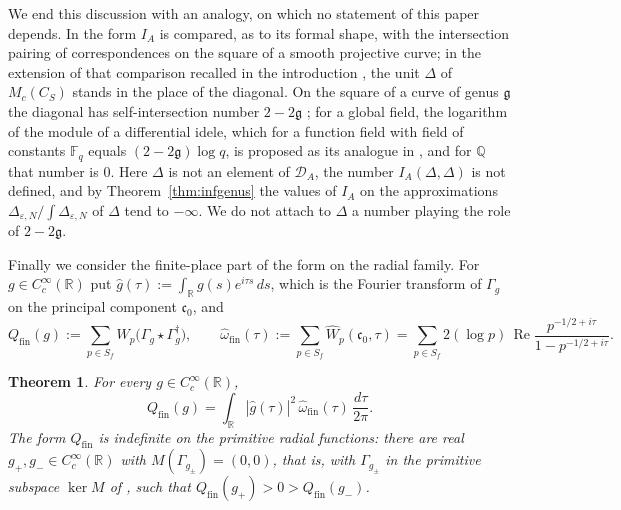 \documentclass[11pt]{amsart}
\newtheorem{theorem}{Theorem}[section]
\theoremstyle{definition}
\newcommand{\R}{\mathbb R}
\newcommand{\Q}{\mathbb Q}
\newcommand{\Rel}{\operatorname{Re}}
\newcommand{\DA}{\mathcal D_A}
\begin{document}
We end this discussion with an analogy, on which no statement of this paper
depends. In \cite[Section~1]{Companion} the form $I_A$ is compared, as to
its formal shape, with the intersection pairing of correspondences on the
square of a smooth projective curve; in the extension of that comparison
recalled in the introduction \cite[Section~7.1]{CCM}, the unit $\Delta$
of $M_c(C_S)$ stands in the place of the diagonal. On the square of a curve
of genus $\mathfrak g$ the diagonal has self-intersection number
$2-2\mathfrak g$ \cite[Ch.~V, Exercise~1.6(a)]{Hartshorne}; for a global
field, the logarithm of the module of a differential idele, which for a
function field with field of constants $\mathbb F_q$ equals
$(2-2\mathfrak g)\log q$, is proposed as its analogue in
\cite[Section~7.1]{CCM}, and for $\Q$ that number is $0$. Here $\Delta$ is
not an element of $\DA$, the number $I_A(\Delta,\Delta)$ is not defined, and
by Theorem~\ref{thm:infgenus} the values of $I_A$ on the approximations
$\Delta_{\varepsilon,N}/\int\Delta_{\varepsilon,N}$ of $\Delta$ tend to
$-\infty$. We do not attach to $\Delta$ a number playing the role of
$2-2\mathfrak g$.

Finally we consider the finite-place part of the form on the radial family.
For $g\in C_c^\infty(\R)$ put $\widehat g(\tau):=\int_\R g(s)e^{i\tau s}\,ds$,
which is the Fourier transform of $\Gamma_g$ on the principal component
$\mathfrak c_0$, and
\begin{equation}\label{eq:qfin}
  Q_{\mathrm{fin}}(g):=\sum_{p\in S_f}W_p\bigl(\Gamma_g\star\Gamma_g^\dagger
   \bigr),\qquad
  \widehat\omega_{\mathrm{fin}}(\tau):=\sum_{p\in S_f}
    \widehat W_p(\mathfrak c_0,\tau)
   =\sum_{p\in S_f}2(\log p)\,\Rel\frac{p^{-1/2+i\tau}}{1-p^{-1/2+i\tau}} .
\end{equation}

\begin{theorem}\label{thm:qfinpositive}
For every $g\in C_c^\infty(\R)$,
\begin{equation}\label{eq:qfinplancherel}
  Q_{\mathrm{fin}}(g)=\int_\R|\widehat g(\tau)|^2\,
    \widehat\omega_{\mathrm{fin}}(\tau)\,\frac{d\tau}{2\pi}.
\end{equation}
The form $Q_{\mathrm{fin}}$ is indefinite on the primitive radial functions:
there are real $g_+,g_-\in C_c^\infty(\R)$ with
$M(\Gamma_{g_\pm})=(0,0)$, that is, with $\Gamma_{g_\pm}$ in the primitive
subspace $\ker M$ of \cite[Definition~6.6]{Companion}, such that
$Q_{\mathrm{fin}}(g_+)>0>Q_{\mathrm{fin}}(g_-)$.
\end{theorem}
\end{document}
